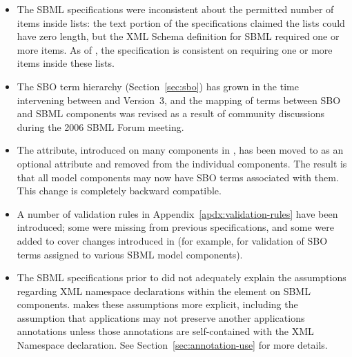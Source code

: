 \begin{itemize}
\item The SBML specifications were inconsistent about the
  permitted number of items inside
   lists: the text portion of the
  specifications claimed the lists could have zero length, but the
  XML Schema definition for SBML required one or more items.  As
  of \sbmltwothree, the specification is consistent on requiring
  one or more items inside these lists.

\item The SBO term hierarchy (Section~\ref{sec:sbo}) has grown in
  the time intervening between \sbmltwotwo and Version~3, and the
  mapping of terms between SBO and SBML components was revised as
  a result of community discussions during the 2006 SBML Forum
  meeting.

\item The  attribute, introduced on many components in
  \sbmltwotwo, has been moved to \SBase as an optional attribute
  and removed from the individual components.  The result is that
  all model components may now have SBO terms associated with
  them.  This change is completely backward compatible.

\item A number of validation rules in
  Appendix~\ref{apdx:validation-rules} have been introduced; some
  were missing from previous specifications, and some were added
  to cover changes introduced in \sbmltwothree (for example, for
  validation of SBO terms assigned to various SBML model
  components).

\item The SBML specifications prior to \sbmltwothree did not
  adequately explain the assumptions regarding XML namespace
  declarations within the  element on SBML
  components.  \sbmltwothree makes these assumptions more
  explicit, including the assumption that applications may not
  preserve another applications annotations unless those
  annotations are self-contained with the XML Namespace
  declaration.  See Section~\ref{sec:annotation-use} for more
  details.


\end{itemize}
